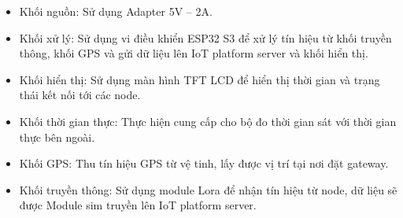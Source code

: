 \documentclass{article} %
\begin{document}
\begin{itemize}
		\begin{itemize}[label=$\ast$]
			\item Khối nguồn: Sử dụng Adapter 5V – 2A.
			\item Khối xử lý: Sử dụng vi điều khiển ESP32 S3 để xử lý tín hiệu từ khối truyền thông, khối GPS và gửi dữ liệu lên IoT platform server và khối hiển thị.
			\item Khối hiển thị: Sử dụng màn hình TFT LCD để hiển thị thời gian và trạng thái kết nối tới các node.
			\item Khối thời gian thực: Thực hiện cung cấp cho bộ đo thời gian sát với thời gian thực bên ngoài.
			\item Khối GPS: Thu tín hiệu GPS từ vệ tinh, lấy được vị trí tại nơi đặt gateway.
			\item Khối truyền thông: Sử dụng module Lora để nhận tín hiệu từ node, dữ liệu sẽ được Module sim truyền lên IoT platform server.
		\end{itemize}
	\end{itemize} 
\end{document}
